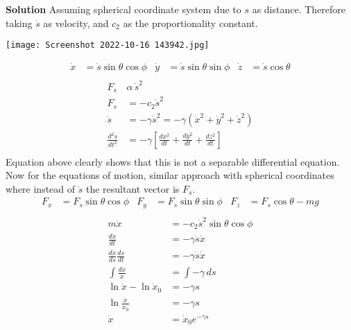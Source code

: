 \documentclass[]{article}
\newcommand{\bd}{\textbf}
\begin{document}
	\bd{Solution} Assuming spherical coordinate system due to $ s $ as distance. Therefore taking $ \dot{s} $ as velocity, and $ c_2 $ as the proportionality constant.
	\begin{center}
		\texttt{[image: Screenshot 2022-10-16 143942.jpg]}
	\end{center}
	\begin{equation}
		\begin{aligned}
			\dot{x} &= \dot{s} \sin \theta \cos \phi & \dot{y} &= \dot{s} \sin \theta \sin \phi & \dot{z} &= \dot{s} \cos \theta \\
		\end{aligned}
	\end{equation}
	\begin{equation}
		\begin{split}
			F_s \, &\alpha \, \dot{s}^2 \\
			F_s &= -c_2 \dot{s}^2 \\
			\ddot{s} &= -\gamma \dot{s}^2 = -\gamma (\dot{x}^2 + \dot{y}^2 +\dot{z}^2) \\
			\frac{d^2 s}{dt^2} &= -\gamma \left[ \frac{dx^2}{dt} + \frac{dy^2}{dt} + \frac{dz^2}{dt} \right] \\
		\end{split}
	\end{equation}
	Equation above clearly shows that this is not a separable differential equation. Now for the equations of motion, similar approach with spherical coordinates where instead of $ \dot{s} $ the resultant vector is $ F_s $.
	\begin{equation}
		\begin{aligned}
			F_x &= F_s \sin \theta \cos \phi & F_y &= F_s \sin \theta \sin \phi & F_z &= F_s \cos \theta - mg \\
		\end{aligned}
	\end{equation}
	\begin{equation}
		\begin{split}
			m\ddot{x} &= -c_2 \dot{s}^2 \sin \theta \cos \phi \\
			\frac{d\dot{x}}{dt} &= -\gamma \dot{s} \dot{x} \\
			\frac{d\dot{x}}{ds} \frac{ds}{dt} &= -\gamma \dot{s} \dot{x} \\
			\int \frac{d\dot{x}}{\dot{x}} &= \int -\gamma \, ds \\
			\ln \dot{x} - \ln \dot{x}_0 &= -\gamma s \\
			\ln \frac{\dot{x}}{\dot{x}_0} &= -\gamma s \\
			\dot{x} &= \dot{x}_0 e^{-\gamma s} \\
		\end{split}
	\end{equation}
	\clearpage
\end{document}
